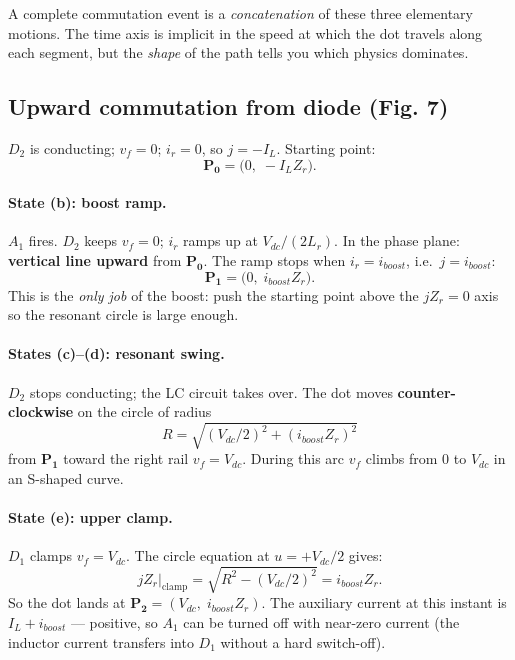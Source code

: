 \documentclass[12pt, a4paper]{article}
\def\,{ }%
\newcommand{\Vdc}{V_{dc}}
\newcommand{\ir}{i_r}
\newcommand{\IL}{I_L}
\begin{document}
\noindent
A complete commutation event is a \emph{concatenation} of these three
elementary motions.
The time axis is implicit in the speed at which the dot travels along each
segment, but the \emph{shape} of the path tells you which physics dominates.

\subsection{Upward commutation from diode (Fig.\,7)}
\label{ssec:pp_fig7}

$D_2$ is conducting; $v_f = 0$; $\ir = 0$, so $j = -\IL$.
Starting point:
\[
    \mathbf{P_0} = \bigl(0,\; -\IL Z_r\bigr).
\]

\paragraph{State (b): boost ramp.}
$A_1$ fires.
$D_2$ keeps $v_f = 0$; $\ir$ ramps up at $\Vdc/(2L_r)$.
In the phase plane: \textbf{vertical line upward} from $\mathbf{P_0}$.
The ramp stops when $\ir = i_{boost}$, i.e.\ $j = i_{boost}$:
\[
    \mathbf{P_1} = \bigl(0,\; i_{boost}\,Z_r\bigr).
\]
This is the \emph{only job} of the boost: push the starting point above the
$jZ_r = 0$ axis so the resonant circle is large enough.

\paragraph{States (c)–(d): resonant swing.}
$D_2$ stops conducting; the LC circuit takes over.
The dot moves \textbf{counter-clockwise} on the circle of radius
\[
    R = \sqrt{(\Vdc/2)^2 + (i_{boost}\,Z_r)^2}
\]
from $\mathbf{P_1}$ toward the right rail $v_f = \Vdc$.
During this arc $v_f$ climbs from 0 to $\Vdc$ in an S-shaped curve.

\paragraph{State (e): upper clamp.}
$D_1$ clamps $v_f = \Vdc$.
The circle equation at $u = +\Vdc/2$ gives:
\[
    jZ_r\big|_{\text{clamp}} = \sqrt{R^2 - (\Vdc/2)^2} = i_{boost}\,Z_r.
\]
So the dot lands at $\mathbf{P_2} = (\Vdc,\; i_{boost}\,Z_r)$.
The auxiliary current at this instant is $\IL + i_{boost}$ --- positive, so
$A_1$ can be turned off with near-zero current (the inductor current transfers
into $D_1$ without a hard switch-off).
\end{document}
